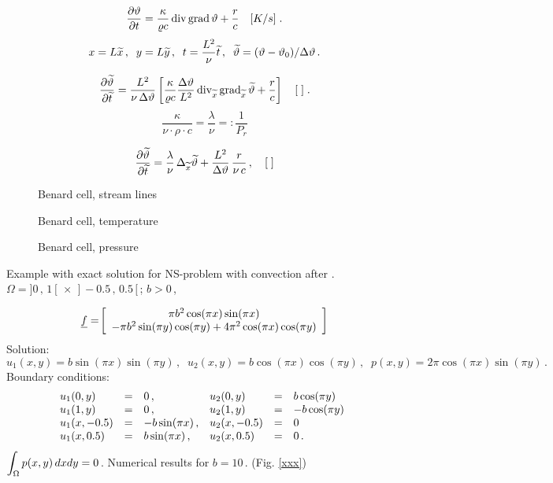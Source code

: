 \documentclass[12pt,a4paper,USenglish,twoside]{book}
\begin{document}
\[
\frac{\da \theta}{\da t} =  \frac{\kappa}{\rho c}\div \grad \theta 
 + \frac{r}{c} \quad [K/s]\; .
\]
%
\[
x = L \wi{x}\,,\;\; y = L \wi{y}\,,\;\;t = \frac{L^2}{\nu}\wi{t} \,, \;\;
\wi{\theta} = (\theta - \theta_0)/\Delta \theta\,.
\]

\[
\frac{\da \wi{\theta}}{\da \wi{t}} = 
\frac{L^2}{\nu \, \Delta \theta}\left[ \frac{\kappa}{\rho c}
\frac{\Delta \theta}{L^2} \div_{\wi{x}}\grad_{\wi{x}}\wi{\theta}
  + \frac{r}{c}\right]
\quad [\;]\; .
\]
\[
\frac{\kappa}{\nu \cdot \rho \cdot c} = \frac{\lambda}{\nu} =: \frac{1}{P_r}
\]

\[
\frac{\da \wi{\theta}}{\da \wi{t}} = 
\frac{\lambda}{\nu }\,\Delta_{\wi{x}}\wi{\theta}
  + \frac{L^2}{\Delta \theta}\, \frac{r}{ \nu\, c}\,, \quad [{}\;]
\]

\newpage



\begin{figure}[H]
\centering
\caption{Benard cell, stream lines}\label{fig0908.10a}
\end{figure}
\par\vspace{-5ex}
\begin{figure}[H]
\centering
\caption{Benard cell, temperature}\label{fig0908.10b}
\end{figure}
\par\vspace{-5ex}
\begin{figure}[H]
\centering
\caption{Benard cell, pressure}\label{fig0908.10c}
\end{figure}
%
\begin{example} Example with exact solution for NS-problem with convection after
\cite{Boukir}. $\Omega = ]0\,,\,1[\, \times\, ]- 0.5\,,\, 0.5\,[\, $; $b > 0$\,,

\[
\f =\ \ba{[}{c}
\pi b^2\cos(\pi x)\sin(\pi x)\\
-\pi b^2 \sin(\pi y)\cos (\pi y) + 4\pi^2\cos(\pi x)\cos(\pi y)
\ea{]}
\]
Solution:
\[
u_1(x,y) = b\sin(\pi x)\sin(\pi y)\,,\;\;
u_2(x,y) = b\cos(\pi x)\cos(\pi y)\,,\;\;
p(x,y) = 2\pi \cos(\pi x)\sin(\pi y)\,.
\]
Boundary conditions:
\[
\ba{.}{llllll}
u_1(0,y) &=& 0\,, & u_2(0,y) &=& b\cos(\pi y)\\
u_1(1,y) &=& 0\,, & u_2(1,y) &=& - b\cos(\pi y)\\
u_1(x,-0.5) &=& - b\sin(\pi x)\,, & u_2(x,-0.5) &=& 0\\
u_1(x,0.5) &=& b\sin(\pi x)\,,    & u_2(x,0.5)  &=& 0\,.
\ea{.}
\]
$\dis \int_{\Omega}p(x,y)\,dxdy = 0$\,. 
Numerical results for $b = 10$\,. (Fig. \ref{xxx})
\end{example}
\end{document}
